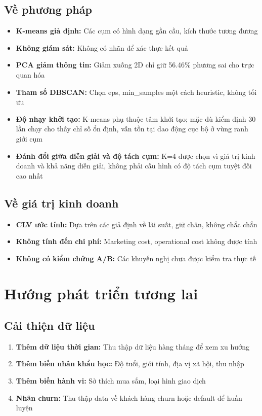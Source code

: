 \subsection{Về phương pháp}

\begin{itemize}
    \item \textbf{K-means giả định:} Các cụm có hình dạng gần cầu, kích thước tương đương
    \item \textbf{Không giám sát:} Không có nhãn để xác thực kết quả
    \item \textbf{PCA giảm thông tin:} Giảm xuống 2D chỉ giữ 56.46\% phương sai cho trực quan hóa
    \item \textbf{Tham số DBSCAN:} Chọn eps, min\_samples một cách heuristic, không tối ưu
    \item \textbf{Độ nhạy khởi tạo:} K-means phụ thuộc tâm khởi tạo; mặc dù kiểm định 30 lần chạy cho thấy chỉ số ổn định, vẫn tồn tại dao động cục bộ ở vùng ranh giới cụm
    \item \textbf{Đánh đổi giữa diễn giải và độ tách cụm:} K=4 được chọn vì giá trị kinh doanh và khả năng diễn giải, không phải cấu hình có độ tách cụm tuyệt đối cao nhất
\end{itemize}

\subsection{Về giá trị kinh doanh}

\begin{itemize}
    \item \textbf{CLV ước tính:} Dựa trên các giả định về lãi suất, giữ chân, không chắc chắn
    \item \textbf{Không tính đến chi phí:} Marketing cost, operational cost không được tính
    \item \textbf{Không có kiểm chứng A/B:} Các khuyến nghị chưa được kiểm tra thực tế
\end{itemize}

\section{Hướng phát triển tương lai}

\subsection{Cải thiện dữ liệu}

\begin{enumerate}
    \item \textbf{Thêm dữ liệu thời gian:} Thu thập dữ liệu hàng tháng để xem xu hướng
    \item \textbf{Thêm biến nhân khẩu học:} Độ tuổi, giới tính, địa vị xã hội, thu nhập
    \item \textbf{Thêm biến hành vi:} Sở thích mua sắm, loại hình giao dịch
    \item \textbf{Nhãn churn:} Thu thập data về khách hàng churn hoặc default để huấn luyện
\end{enumerate}

